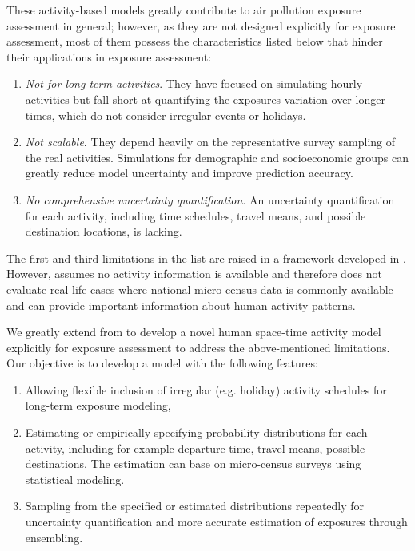 \documentclass[]{article}
\begin{document}
These activity-based models greatly contribute to air pollution exposure assessment in general; however, as they are not designed explicitly for exposure assessment, most of them possess the characteristics listed below that hinder their applications in exposure assessment: 

\begin{enumerate}
    
    \item \textit{Not for long-term activities}. They have focused on simulating hourly activities but fall short at quantifying the exposures variation over longer times, which do not consider irregular events or holidays. 
    
    \item \textit{Not scalable}. They depend heavily on the representative survey sampling of the real activities. Simulations for demographic and socioeconomic groups \citep{lee2013impact} can greatly reduce model uncertainty and improve prediction accuracy.   
    
    \item \textit{No comprehensive uncertainty quantification}. An uncertainty quantification for each activity, including time schedules, travel means, and possible destination locations, is lacking.  
\end{enumerate}
 
 The first and third limitations in the list are raised in a framework developed in \cite{lu2019activity}. However, \cite{lu2019activity} assumes no activity information is available and therefore does not evaluate real-life cases where national micro-census data is commonly available and can provide important information about human activity patterns.  
 
We greatly extend from \cite{lu2019activity} to develop a novel human space-time activity model explicitly for exposure assessment to address the above-mentioned limitations. Our objective is to develop a model with the following features: 

\begin{enumerate}

    \item Allowing flexible inclusion of irregular (e.g. holiday) activity schedules for long-term exposure modeling, 
    
    \item Estimating or empirically specifying probability distributions for each activity, including for example departure time, travel means, possible destinations. The estimation can base on micro-census surveys using statistical modeling.
    
    \item Sampling from the specified or estimated distributions repeatedly for uncertainty quantification and more accurate estimation of exposures through ensembling. 
\end{enumerate}
\end{document}
